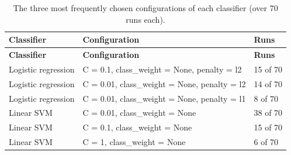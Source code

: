 \documentclass[11pt,a4paper]{article}
\begin{document}
\begin{center}\small\renewcommand{\arraystretch}{1.15}
\begin{longtable}{>{\raggedright\arraybackslash}p{2.02cm}>{\raggedright\arraybackslash}p{11.20cm}>{\raggedleft\arraybackslash}p{2.02cm}}
\caption{The three most frequently chosen configurations of each classifier (over 70 runs each).}\\
\toprule
\textbf{\hspace{0pt}Classifier} & \textbf{\hspace{0pt}Configuration} & \textbf{\hspace{0pt}Runs}\\\midrule\endfirsthead
\toprule
\textbf{\hspace{0pt}Classifier} & \textbf{\hspace{0pt}Configuration} & \textbf{\hspace{0pt}Runs}\\\midrule\endhead
\bottomrule\endfoot
\hspace{0pt}Logistic regression & \hspace{0pt}C = 0.1, class\_\allowbreak{}weight = None, penalty = l2 & \hspace{0pt}15 of 70\\
\hspace{0pt}Logistic regression & \hspace{0pt}C = 0.01, class\_\allowbreak{}weight = None, penalty = l2 & \hspace{0pt}14 of 70\\
\hspace{0pt}Logistic regression & \hspace{0pt}C = 0.01, class\_\allowbreak{}weight = None, penalty = l1 & \hspace{0pt}8 of 70\\
\hspace{0pt}Linear SVM & \hspace{0pt}C = 0.01, class\_\allowbreak{}weight = None & \hspace{0pt}38 of 70\\
\hspace{0pt}Linear SVM & \hspace{0pt}C = 0.1, class\_\allowbreak{}weight = None & \hspace{0pt}15 of 70\\
\hspace{0pt}Linear SVM & \hspace{0pt}C = 1, class\_\allowbreak{}weight = None & \hspace{0pt}6 of 70\\

\end{longtable}
\end{center}
\end{document}
